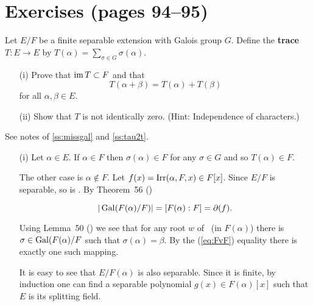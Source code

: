 \section{Exercises (pages 94--95)}

\begin{myenumerate}

\item
\begin{excopy}
Let \label{ex:trace:def}
\(E/F\) be a finite separable extension with Galois group $G$.
Define the
\textbf{trace} \(T: E \rightarrow E\) by
\(T(\alpha) =  \sum_{\sigma \in G} \sigma(\alpha)\).
\begin{itemize}
 \item[(i)]
   Prove that \(\mathop{\rm im}\nolimits T \subset F\) and that
   \begin{equation*}
      T(\alpha + \beta) = T(\alpha) + T(\beta)
   \end{equation*}
   for all \(\alpha, \beta \in E\).
 \item[(ii)]
   Show that $T$ is not identically zero.  (Hint: Independence of characters.)
\end{itemize}
\end{excopy}

See notes of \ref{ss:missgal} and \ref{ss:tau2t}.

\begin{itemize}
 \item [(i)]
    Let \(\alpha\in E\). If \(\alpha\in F\) then \(\sigma(\alpha)\in F\)
    for any \(\sigma\in G\) and so \(T(\alpha)\in F\).

    The other case is \(\alpha \notin F\). Let
    \(f(x)=\mathop{\rm Irr}\nolimits(\alpha,F,x)\in F[x]\).  Since \(E/F\) is separable, so
    is \fx.  By Theorem~56 (\cite{Rotman98})

    \begin{equation} \label{eq:FvF}
      |\mathop{\rm Gal}\nolimits(F(\alpha)/F)| = [F(\alpha):F] = \partial(f).
    \end{equation}

    Using Lemma~50 (\cite{Rotman98}) we see that for
    any root $w$ of \fx\ (in \(F(\alpha)\)) there is
    \(\sigma\in  \mathop{\rm Gal}\nolimits(F(\alpha)/F\)
    such that \(\sigma(\alpha)=\beta\).  By the
    (\ref{eq:FvF}) equality there is exactly one such mapping.

    It is easy to see that \(E/F(\alpha)\) is also separable. Since it
    is finite, by induction one can find a separable polynomial
    \(g(x)\in F(\alpha)[x]\) such that $E$ is its splitting field.


\end{itemize}
\end{myenumerate}
